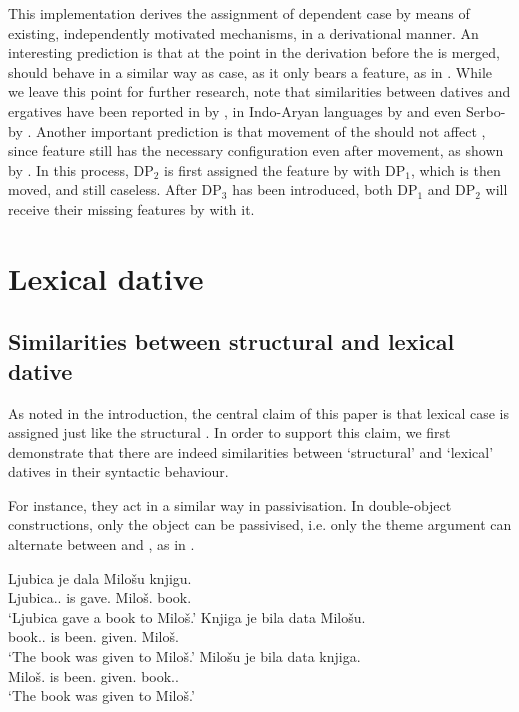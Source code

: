 \documentclass[output=paper,modfonts,newtxmath,hidelinks]{langscibook}
\begin{document}
\noindent This implementation derives the assignment of dependent case by means of existing, independently motivated mechanisms, in a derivational manner. An interesting prediction is that at the point in the derivation before the  is merged,  should behave in a similar way as  case, as it only bears a \lr{} feature, as in .  While we leave this point for further research, note that similarities between datives and ergatives have been reported in  by \citet{arreginevins12}, in Indo-Aryan languages by \citet{butt06} and even Serbo- by \citet{progovac13}. Another important prediction is that movement of the  should not affect \accc{} , since \hr{} feature still has the necessary configuration even after movement, as shown by . In this process, DP$_{2}$ is first assigned the \lr{} feature by \down{} with DP$_{1}$, which is then moved, and still caseless. After DP$_{3}$ has been introduced, both DP$_{1}$ and DP$_{2}$ will receive their missing \hr{} features by \up{} with it.

\section{Lexical dative}

\subsection{Similarities between structural and lexical dative}

As noted in the introduction, the central claim of this paper is that lexical  case is assigned just like the structural . In order to support this claim, we first demonstrate that there are indeed similarities between `structural' and `lexical' datives in their syntactic behaviour.

For instance, they act in a similar way in passivisation. In double-object constructions, only the  object can be passivised, i.e. only the theme argument can alternate between  and , as in .

\ea\label{16:structuraldativepassive} 
\ea \gll Ljubica je dala Milošu knjigu.\\
Ljubica.\nomm.\fsg{} is gave.\fsg{} Miloš.\datt{} book.\accc\\
\glt `Ljubica gave a book to Miloš.'
\ex \gll Knjiga je bila data Milošu.\\
book.\nomm.\fsg{} is been.\fsg{} given.\fsg{} Miloš.\datt\\
\glt `The book was given to Miloš.'
\ex \label{16:structuraldativepassiveb}\gll Milošu je bila data knjiga.\\
Miloš.\datt{} is been.\fsg{} given.\fsg{} book.\nomm.\fsg\\
\glt `The book was given to Miloš.'
\z \z
\end{document}

